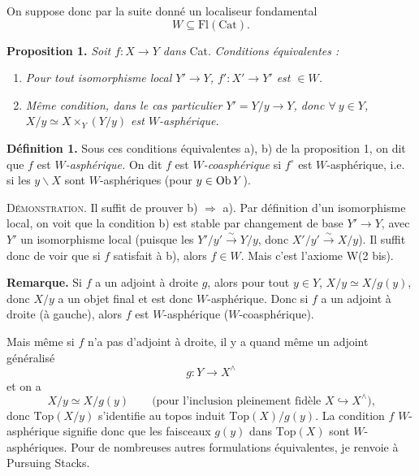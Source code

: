 On suppose donc par la suite donné un localiseur fondamental
\[
W \subseteq \mathrm{Fl}(\mathrm{Cat}).
\]

\textbf{Proposition 1.} \textit{Soit $f : X \longrightarrow Y$ dans} \textup{Cat}. \textit{Conditions équivalentes :}

\begin{enumerate}
\item[\textit{a)}] \textit{Pour tout isomorphisme local $Y' \longrightarrow Y$, $f' : X' \longrightarrow Y'$ est $\in W$.}
\item[\textit{b)}] \textit{Même condition, dans le cas particulier $Y' = Y/y \longrightarrow Y$, donc $\forall\ y \in Y$, $X/y \simeq X \times_Y (Y/y)$ est $W$-asphérique.}
\end{enumerate}

\textbf{Définition 1.} Sous ces conditions équivalentes a), b) de la proposition 1, on dit que $f$ est \textit{$W$-asphérique.} On dit $f$ est \textit{$W$-coasphérique} si $f^{\circ}$ est $W$-asphérique, i.e. si les $y\backslash X$ sont $W$-asphériques (pour $y \in \operatorname{Ob} Y$).

\textsc{Démonstration.} Il suffit de prouver b) $\Longrightarrow$ a). Par définition d'un isomorphisme local, on voit que la condition b) est stable par changement de base $Y' \longrightarrow Y$, avec $Y'$ un isomorphisme local (puisque les $Y'/y' \xrightarrow{\sim} Y/y$, donc $X'/y' \xrightarrow{\sim} X/y$). Il suffit donc de voir que si $f$ satisfait à b), alors $f \in W$. Mais c'est l'axiome W(2 bis).

\begin{center}
\end{center}


\textbf{Remarque.} Si $f$ a un adjoint à droite $g$, alors pour tout $y \in Y$, $X/y \simeq X/g(y)$, donc $X/y$ a un objet final et est donc $W$-asphérique. Donc si $f$ a un adjoint à droite (à gauche), alors $f$ est $W$-asphérique ($W$-coasphérique).

Mais même si $f$ n'a pas d'adjoint à droite, il y a quand même un adjoint généralisé
\[
g : Y \longrightarrow X^{\wedge}
\]
et on a
\[
X/y \simeq X/g(y) \qquad \text{(pour l'inclusion pleinement fidèle $X \hookrightarrow X^{\wedge}$),}
\]
donc $\mathrm{Top}(X/y)$ s'identifie au topos induit $\mathrm{Top}(X)/g(y)$. La condition $f$ $W$-asphérique signifie donc que les faisceaux $g(y)$ dans $\mathrm{Top}(X)$ sont
$W$-asphériques. Pour de nombreuses autres formulations équivalentes, je renvoie à Pursuing Stacks.

